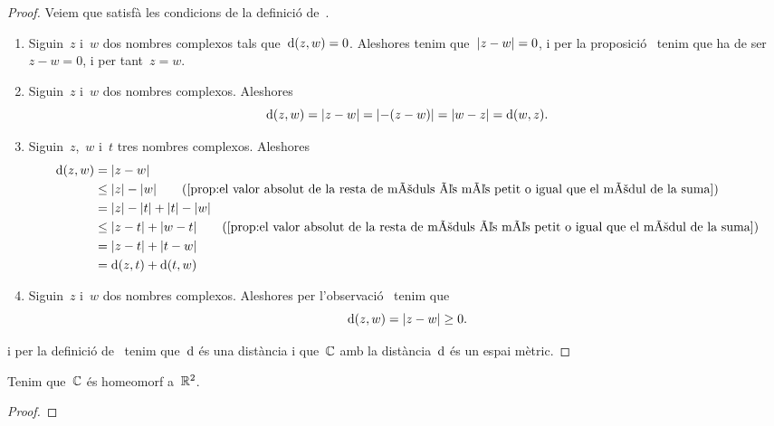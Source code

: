 \documentclass[../Apunts.tex]{subfiles}
\begin{document}
	\begin{proof}
		Veiem que satisfà les condicions de la definició de~.
		\begin{enumerate}
			\item Siguin~\(z\) i~\(w\) dos nombres complexos tals
				que~\(\operatorname{d}(z,w)=0\).
				Aleshores tenim que~\(\modul{z-w}=0\), i per la
				proposició~ tenim que ha de ser~\(z-w=0\),
				i per tant~\(z=w\).
			\item Siguin~\(z\) i~\(w\) dos nombres complexos.
				Aleshores
				\[
					\distancia(z,w)
					=\modul{z-w}
					=\modul{-(z-w)}
					=\modul{w-z}
					=\distancia(w,z).
				\]
			\item Siguin~\(z\),~\(w\) i~\(t\) tres nombres complexos.
				Aleshores
				\begin{align*}
					\distancia(z,w)&=\modul{z-w} \\
					&\leq\modul{z}-\modul{w}
					\tag{\ref{prop:el valor absolut de la resta de mòduls és %
					més petit o igual que el mòdul de la suma}}\\
					&=\modul{z}-\modul{t}+\modul{t}-\modul{w} \\
					&\leq\modul{z-t}+\modul{w-t}
					\tag{\ref{prop:el valor absolut de la resta de mòduls és %
					més petit o igual que el mòdul de la suma}}\\
					&=\modul{z-t}+\modul{t-w} \\
					&=\distancia(z,t)+\distancia(t,w)
				\end{align*}
			\item Siguin~\(z\) i~\(w\) dos nombres complexos.
				Aleshores per l'observació~ tenim que
			\[\distancia(z,w)=\modul{z-w}\geq0.\]
		\end{enumerate}
		i per la definició de~ tenim que~\(\operatorname{d}\)
		és una distància i que~\(\mathbb{C}\) amb la distància~\(\operatorname{d}\) és un
		espai mètric.
	\end{proof}
	\begin{proposition}
		\label{prop:el pla complex és homeomorf al pla real}
		Tenim que~\(\mathbb{C}\) és homeomorf a~\(\mathbb{R}^{2}\).
	\end{proposition}
	\begin{proof}
	\end{proof}
		
\end{document}
